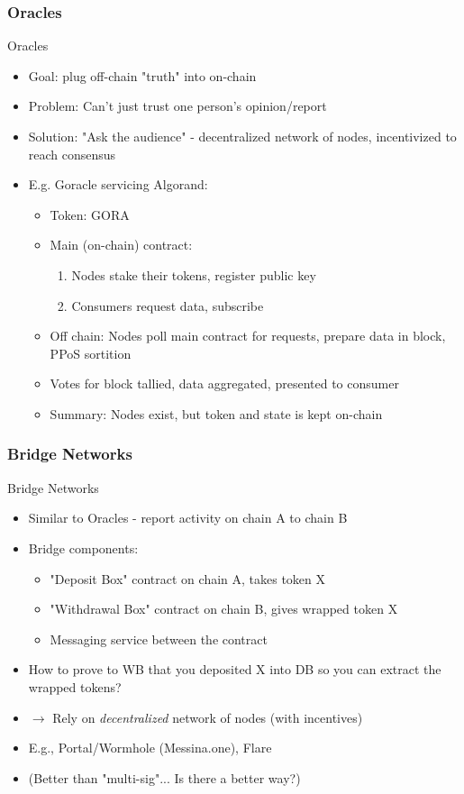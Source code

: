 \documentclass[aspectratio=169,xcolor=dvipsnames]{beamer}
\begin{document}
\subsubsection{Oracles}
\begin{frame}{Oracles}
\begin{itemize}
    \item Goal: plug off-chain "truth" into on-chain
    \item Problem: Can't just trust one person's opinion/report
    \item Solution: "Ask the audience" - decentralized network of nodes, incentivized to reach consensus
    \item E.g. Goracle servicing Algorand:
    \begin{itemize}
        \item Token: GORA 
        \item Main (on-chain) contract:
        \begin{enumerate}
            \item Nodes stake their tokens, register public key
            \item Consumers request data, subscribe
        \end{enumerate}
        \item Off chain: Nodes poll main contract for requests, prepare data in block, PPoS sortition
        \item Votes for block tallied, data aggregated, presented to consumer 
        \item Summary: Nodes exist, but token and state is kept on-chain
    \end{itemize}
\end{itemize}    
\end{frame}
\subsubsection{Bridge Networks}
\begin{frame}{Bridge Networks}
\begin{itemize}
    \item Similar to Oracles - report activity on chain A to chain B
    \item Bridge components:
    \begin{itemize}
        \item "Deposit Box" contract on chain A, takes token X
        \item "Withdrawal Box" contract on chain B, gives wrapped token X
        \item Messaging service between the contract
    \end{itemize}
    \item How to prove to WB that you deposited X into DB so you can extract the wrapped tokens?
    \item $\rightarrow$ Rely on \textit{decentralized} network of nodes (with incentives)
    \item E.g., Portal/Wormhole (Messina.one), Flare
    \item (Better than "multi-sig"... Is there a better way?)
\end{itemize}
    
\end{frame}
\end{document}
